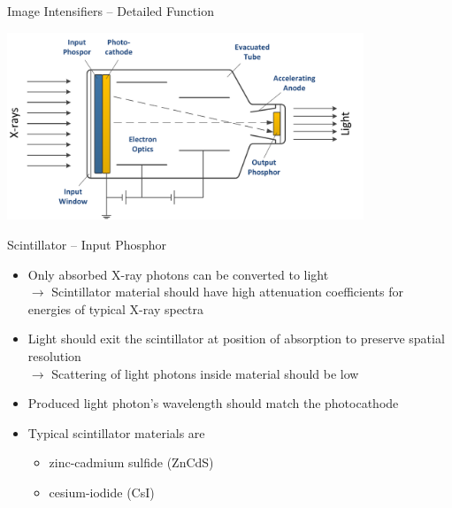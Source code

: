 \begin{frame}{Image Intensifiers -- Detailed Function}
    \begin{center}
        \includegraphics[width=0.8\textwidth]{images/Intensifier_Detail}
    \end{center}
\end{frame}

\begin{frame}{Scintillator -- Input Phosphor}
    \begin{itemize}
        \setlength\itemsep{0.3cm}
        \item  Only absorbed X-ray photons can be converted to light\\
              $\rightarrow$ Scintillator material should have high attenuation coefficients for\\ \hspace{1cm}energies of typical X-ray spectra
        \item  Light should exit the scintillator at position of absorption to preserve spatial resolution\\
              $\rightarrow$ Scattering of light photons inside material should be low
        \item  Produced light photon's wavelength should match the photocathode
        \item  Typical scintillator materials are
              \begin{itemize}
                  \item zinc-cadmium sulfide (ZnCdS)%
                  \item cesium-iodide (CsI)%
              \end{itemize}
    \end{itemize}
\end{frame}

